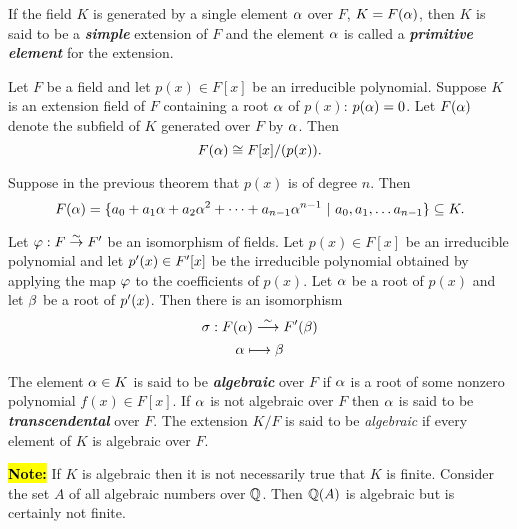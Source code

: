 \begin{defn}
If the field $K$ is generated by a single element $\alpha$ over $F$, $K = F(\alpha)$, then $K$ is said to be a \textit{\textbf{simple}} extension of $F$ and the element $\alpha$ is called a \textit{\textbf{primitive element}} for the extension.
\end{defn}

\nl

\begin{thm}
Let $F$ be a field and let $p(x) \in F[x]$ be an irreducible polynomial. Suppose $K$ is an extension field of $F$ containing a root $\alpha$ of $p(x)$: $p(\alpha) = 0$. Let $F(\alpha)$ denote the subfield of $K$ generated over $F$ by $\alpha$. Then
\[F(\alpha) \cong F[x]/(p(x)).\]
\end{thm}

\nl

\begin{cor}
Suppose in the previous theorem that $p(x)$ is of degree $n$. Then
\[F(\alpha) = \{a_0 + a_1\alpha + a_2\alpha^2 + \cdots + a_{n - 1}\alpha^{n - 1} \ |\ a_0, a_1, \ldots a_{n - 1}\}\subseteq K.\]
\end{cor}

\nl

\begin{thm}
Let $\varphi: F\overset{\sim}{\rightarrow} F^\prime$ be an isomorphism of fields. Let $p(x)\in F[x]$ be an irreducible polynomial and let $p^\prime(x)\in F^\prime[x]$ be the irreducible polynomial obtained by applying the map $\varphi$ to the coefficients of $p(x)$. Let $\alpha$ be a root of $p(x)$ and let $\beta$ be a root of $p^\prime(x)$. Then there is an isomorphism 
\[\sigma:F(\alpha)\overset{\sim}\longrightarrow F^\prime(\beta)\]
\[\alpha\longmapsto \beta\]
\end{thm}

\nl

\begin{defn}
The element $\alpha\in K$ is said to be \textit{\textbf{algebraic}} over $F$ if $\alpha$ is a root of some nonzero polynomial $f(x)\in F[x]$. If $\alpha$ is not algebraic over $F$ then $\alpha$ is said to be \textit{\textbf{transcendental}} over $F$. The extension $K/F$ is said to be \textit{algebraic} if every element of $K$ is algebraic over $F$.
\end{defn}

\nl

\hl{\textbf{Note:}} If $K$ is algebraic then it is not necessarily true that $K$ is finite. Consider the set $A$ of all algebraic numbers over $\mathbb{Q}$. Then $\mathbb{Q}(A)$ is algebraic but is certainly not finite.

